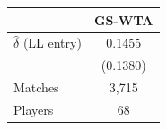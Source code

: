 \begin{tabular}{lc}
\toprule
 & GS-WTA \\
\midrule
$\hat{\delta}$ (LL entry) & 0.1455 \\
 & (0.1380) \\
\midrule
Matches & 3,715 \\
Players & 68 \\
\bottomrule
\end{tabular}
